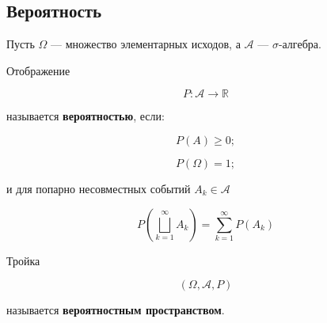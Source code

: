 \documentclass[12pt,a4paper]{article}
\begin{document}
\subsection{Вероятность}

\begin{definition}

Пусть $\Omega$ — множество элементарных исходов, а $\mathcal{A}$ — $\sigma$-алгебра.

Отображение

\[
P:\mathcal{A}\to\mathbb{R}
\]

называется \textbf{вероятностью}, если:

\[
P(A)\geq0;
\]

\[
P(\Omega)=1;
\]

и для попарно несовместных событий $A_k\in\mathcal{A}$

\[
P\left(
\bigsqcup_{k=1}^{\infty}A_k
\right)
=
\sum_{k=1}^{\infty}P(A_k)
\]

Тройка

\[
(\Omega,\mathcal{A},P)
\]

называется \textbf{вероятностным пространством}.

\end{definition}
\end{document}
